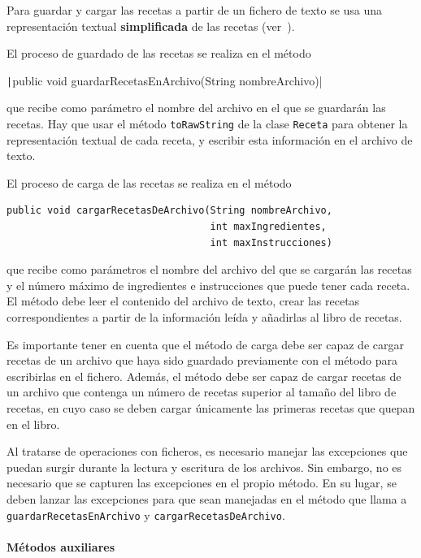 \documentclass[
    a4paper, %
    12pt, %
]{CSSullivanBusinessReport}
\begin{document}
Para guardar y cargar las recetas a partir de un fichero de texto se usa una representación textual \textbf{simplificada} de las recetas (ver~).

El proceso de guardado de las recetas se realiza en el método

\texttt|public void guardarRecetasEnArchivo(String nombreArchivo)|

que recibe como parámetro el nombre del archivo en el que se guardarán las recetas. Hay que usar el método \texttt{toRawString} de la clase \texttt{Receta} para obtener la representación textual de cada receta, y escribir esta información en el archivo de texto.

El proceso de carga de las recetas se realiza en el método

\begin{verbatim}
public void cargarRecetasDeArchivo(String nombreArchivo, 
                                   int maxIngredientes,
                                   int maxInstrucciones)
\end{verbatim}

que recibe como parámetros el nombre del archivo del que se cargarán las recetas y el número máximo de ingredientes e instrucciones que puede tener cada receta. El método debe leer el contenido del archivo de texto, crear las recetas correspondientes a partir de la información leída y añadirlas al libro de recetas.

Es importante tener en cuenta que el método de carga debe ser capaz de cargar recetas de un archivo que haya sido guardado previamente con el método para escribirlas en el fichero. Además, el método debe ser capaz de cargar recetas de un archivo que contenga un número de recetas superior al tamaño del libro de recetas, en cuyo caso se deben cargar únicamente las primeras recetas que quepan en el libro.

Al tratarse de operaciones con ficheros, es necesario manejar las excepciones que puedan surgir durante la lectura y escritura de los archivos. Sin embargo, no es necesario que se capturen las excepciones en el propio método. En su lugar, se deben lanzar las excepciones para que sean manejadas en el método que llama a \texttt{guardarRecetasEnArchivo} y \texttt{cargarRecetasDeArchivo}.

\paragraph{Métodos auxiliares}
\end{document}
